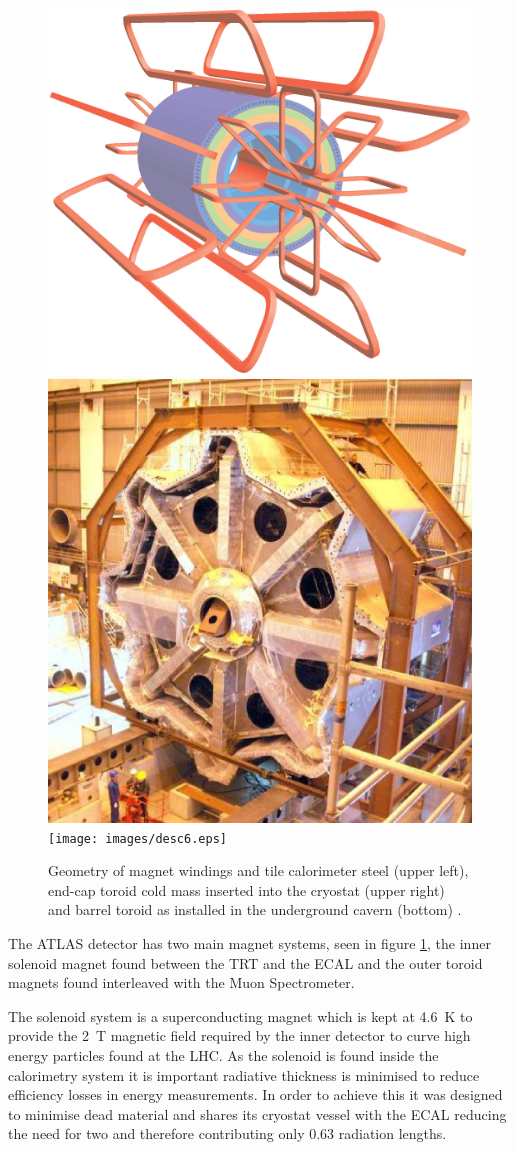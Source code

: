 		\begin{figure}[h!]
			\begin{center}
				\includegraphics[width=0.48\linewidth]{images/ATLcoilGeom.eps}
				\includegraphics[width=0.48\linewidth]{images/desc5.eps}\\
				\texttt{[image: images/desc6.eps]}
			\end{center}
			\caption{Geometry of magnet windings and tile calorimeter steel (upper left), end-cap toroid cold mass inserted into the cryostat (upper right) and barrel toroid as installed in the underground cavern (bottom) \cite{Aad:1129811}.}
			\label{fig:ATLAS_magnet}
		\end{figure}

		The ATLAS detector has two main magnet systems, seen in figure \ref{fig:ATLAS_magnet}, the inner solenoid magnet found between the TRT and the ECAL and the outer toroid magnets found interleaved with the Muon Spectrometer. 

		The solenoid system is a superconducting magnet which is kept at \SI{4.6}{\K} to provide the \SI{2}{T} magnetic field required by the inner detector to curve high energy particles found at the LHC. As the solenoid is found inside the calorimetry system it is important radiative thickness is minimised to reduce efficiency losses in energy measurements. In order to achieve this it was designed to minimise dead material and shares its cryostat vessel with the ECAL reducing the need for two and therefore contributing only 0.63 radiation lengths.

